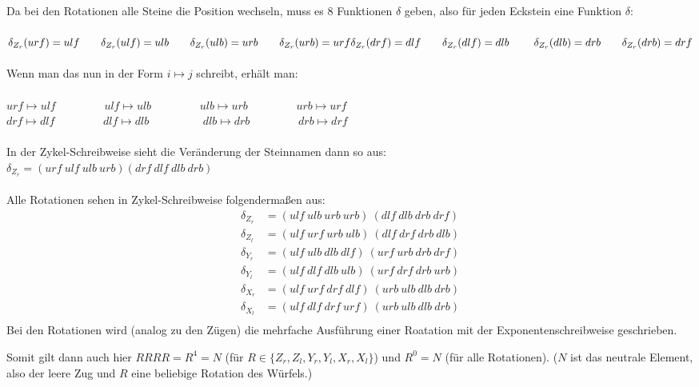 \documentclass[12pt,a4paper, usenames, dvipsnames]{article}
\begin{document}
{Da bei den Rotationen alle Steine die Position wechseln, muss es 8 Funktionen $\delta$ geben, also für jeden Eckstein eine Funktion $\delta$: \\
\\
$
\delta_{Z_r}(urf) = ulf \ \ \ \ \ \ \delta_{Z_r}(ulf) = ulb \ \ \ \ \ \ \delta_{Z_r}(ulb) = urb \ \ \ \ \ \ \delta_{Z_r}(urb) = urf \\
\delta_{Z_r}(drf) = dlf \ \ \ \ \ \ \delta_{Z_r}(dlf) = dlb \ \ \ \ \ \ \ \delta_{Z_r}(dlb) = drb \ \ \ \ \ \ \delta_{Z_r}(drb) = drf
$}
\\
\\
Wenn man das nun in der Form $i \mapsto j$ schreibt, erhält man: \\
\\
$urf \mapsto ulf$ \ \ \ \ \ \ \ \ $ulf \mapsto ulb$ \ \ \ \ \ \ \ \ $ulb \mapsto urb$ \ \ \ \ \ \ \ \ $urb \mapsto urf$ \\
$drf \mapsto dlf$ \ \ \ \ \ \ \ \ $dlf \mapsto dlb$ \ \ \ \ \ \ \ \ \ $dlb \mapsto drb$ \ \ \ \ \ \ \ \ $drb \mapsto drf$ \\
\\
In der Zykel-Schreibweise sieht die Veränderung der Steinnamen dann so aus: \\
$\delta_{Z_r}=(urf \ ulf \ ulb \ urb)(drf \ dlf \ dlb \ drb )$ \\
\\
Alle Rotationen sehen in Zykel-Schreibweise folgendermaßen aus:
\begin{align*}
\delta_{Z_r} & = (ulf \ ulb \ urb \ urb) \ (dlf \ dlb \ drb \ drf)\\
\delta_{Z_l} & = (ulf \ urf \ urb \ ulb) \ (dlf \ drf \ drb \ dlb)\\
\delta_{Y_r} & = (ulf \ ulb \ dlb \ dlf) \ (urf \ urb \ drb \ drf)\\
\delta_{Y_l} & = (ulf \ dlf \ dlb \ ulb) \ (urf \ drf \ drb \ urb)\\
\delta_{X_r} & = (ulf \ urf \ drf \ dlf) \ (urb \ ulb \ dlb \ drb)\\
\delta_{X_l} & = (ulf \ dlf \ drf \ urf) \ (urb \ ulb \ dlb \ drb)\\
\end{align*}
Bei den Rotationen wird (analog zu den Zügen) die mehrfache Ausführung einer Roatation mit der Exponentenschreibweise geschrieben. 

Somit gilt dann auch hier $RRRR=R^4=N$ (für $R \in \{{Z_r}, {Z_l}, {Y_r}, {Y_l}, {X_r}, {X_l} \}$) und $R^0=N$ (für alle Rotationen). ($N$ ist das neutrale Element, also der leere Zug und $R$ eine beliebige Rotation des Würfels.) 
\end{document}
